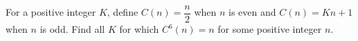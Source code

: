 For a positive integer $K$, define $C(n)=\dfrac{n}{2}$ when $n$ is even and $C(n)=Kn+1$ when $n$ is odd. Find all $K$ for which $C^6(n)=n$ for some positive integer $n$.
